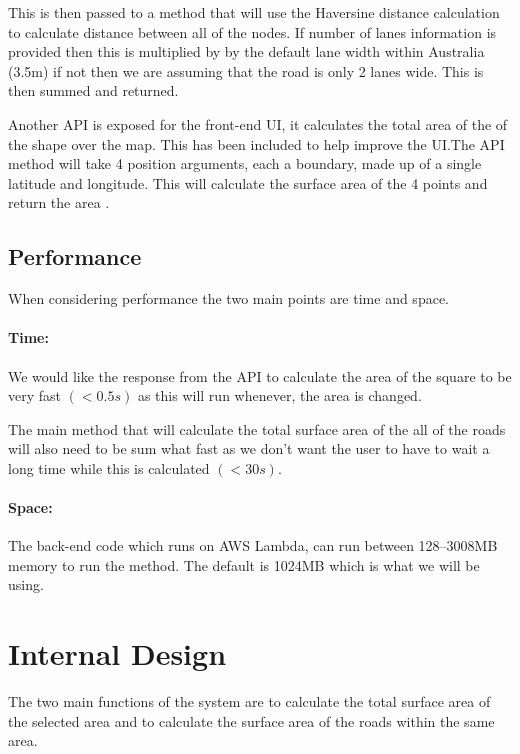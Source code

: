 \documentclass[a4paper,11pt]{article}
\begin{document}
This is then passed to a method that will use the Haversine distance calculation
\autocite{hav:8} to calculate distance between all of the nodes. If number of
lanes information is provided then this is multiplied by by the default lane
width within Australia (3.5m) \autocite{lane:9} if not then we are assuming that
the road is only 2 lanes wide. This is then summed and returned.

Another API is exposed for the front-end UI, it calculates the total area of the
of the shape over the map. This has been included to help improve the UI.\@ The
API method will take 4 position arguments, each a boundary, made up of a single
latitude and longitude. This will calculate the surface area of the 4 points and
return the area \autocite{math:10}.

\subsection{Performance}

When considering performance the two main points are time and space.

\paragraph{Time:}

We would like the response from the API to calculate the area of the square to
be very fast $(< 0.5s)$ as this will run whenever, the area is changed.

The main method that will calculate the total surface area of the all of the
roads will also need to be sum what fast as we don't want the user to have to
wait a long time while this is calculated $(< 30s)$.

\paragraph{Space:}

The back-end code which runs on AWS Lambda, can run between 128--3008MB memory
to run the method. The default is 1024MB which is what we will be using.

\section{Internal Design}

The two main functions of the system are to calculate the total surface area of
the selected area and to calculate the surface area of the roads within the same
area.
\end{document}
